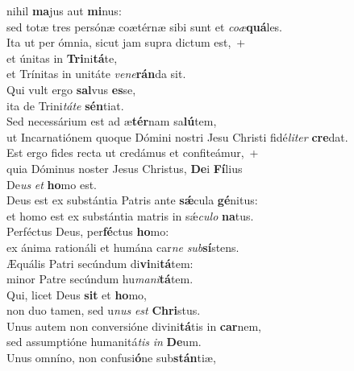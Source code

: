\evenverse  nihil \textbf{ma}jus aut \textbf{mi}nus:~\*\\
\evenverse sed totæ tres persónæ coætérnæ sibi sunt et \textit{co}\textit{æ}\textbf{quá}les.\\
\oddverse Ita ut per ómnia, sicut jam supra dictum est,~+\\
\oddverse  et únitas in \textbf{Tri}ni\textbf{tá}te,~\*\\
\oddverse et Trínitas in unitáte \textit{ve}\textit{ne}\textbf{rán}da sit.\\
\evenverse Qui vult ergo \textbf{sal}vus \textbf{es}se,~\*\\
\evenverse ita de Trini\textit{tá}\textit{te} \textbf{sén}tiat.\\
\oddverse Sed necessárium est ad æ\textbf{tér}nam sa\textbf{lú}tem,~\*\\
\oddverse ut Incarnatiónem quoque Dómini nostri Jesu Christi fidé\textit{li}\textit{ter} \textbf{cre}dat.\\
\evenverse Est ergo fides recta ut credámus et confiteámur,~+\\
\evenverse  quia Dóminus noster Jesus Christus, \textbf{De}i \textbf{Fí}lius~\*\\
\evenverse De\textit{us} \textit{et} \textbf{ho}mo est.\\
\oddverse Deus est ex substántia Patris ante \textbf{sǽ}cula \textbf{gé}nitus:~\*\\
\oddverse et homo est ex substántia matris in sǽ\textit{cu}\textit{lo} \textbf{na}tus.\\
\evenverse Perféctus Deus, per\textbf{fé}ctus \textbf{ho}mo:~\*\\
\evenverse ex ánima rationáli et humána car\textit{ne} \textit{sub}\textbf{sí}stens.\\
\oddverse Æquális Patri secúndum di\textbf{vi}ni\textbf{tá}tem:~\*\\
\oddverse minor Patre secúndum hu\textit{ma}\textit{ni}\textbf{tá}tem.\\
\evenverse Qui, licet Deus \textbf{sit} et \textbf{ho}mo,~\*\\
\evenverse non duo tamen, sed u\textit{nus} \textit{est} \textbf{Chri}stus.\\
\oddverse Unus autem non conversióne divini\textbf{tá}tis in \textbf{car}nem,~\*\\
\oddverse sed assumptióne humanitá\textit{tis} \textit{in} \textbf{De}um.\\
\evenverse Unus omníno, non confusi\textbf{ó}ne sub\textbf{stán}tiæ,~\*\\
